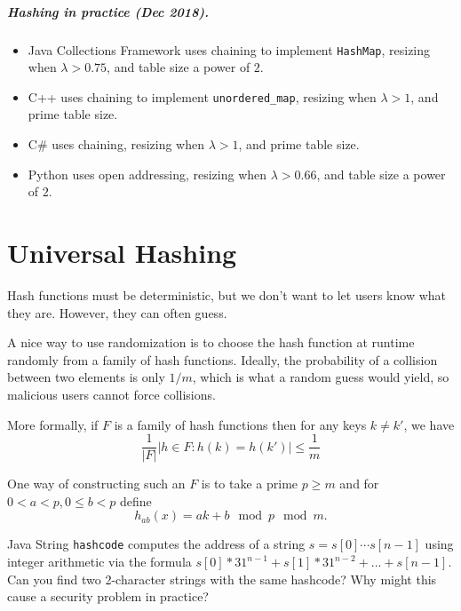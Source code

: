 \paragraph{Hashing in practice (Dec 2018).}
\begin{itemize}
\item Java Collections Framework uses chaining to implement \texttt{HashMap}, resizing when $\lambda > 0.75$, and table size a power of $2$.
\item C++  uses chaining to implement \texttt{unordered\_map}, resizing when $\lambda >1$, and prime table size.
\item C\# uses chaining, resizing when $\lambda >1$, and prime table size.
\item Python uses open addressing, resizing when $\lambda>0.66$, and table size a power of $2$.
\end{itemize}





\chapter{Universal Hashing} %


Hash functions must be deterministic, but we don't want  to let users know what they are. 
However, they can often guess. 

A nice way to use randomization is to choose the hash function at runtime randomly from a family of hash functions.
Ideally,   the probability of a collision between two elements is only $1/m$, which is what a random guess would yield, so malicious users cannot 
force collisions.

More formally, if $F$ is a family of hash functions then for any keys $k\neq k'$, we have
$$
\frac{1}{|F|} \left| h\in F : h(k) = h(k') \right| \leq \frac{1}{m}
$$

\begin{Boxample}[6]
One way of constructing such an $F$ is to take a prime $p\geq m$  and for $0<a <p, 0\leq b < p$ define 
$$h_{ab}(x) = ak+b \mod p \mod m.$$

\end{Boxample}


 

\begin{Boxample}[4]
\item Java String \texttt{hashcode} computes the address of a string 
$s=s[0]\cdots s[n-1]$ using integer arithmetic via the formula 
$s[0]*31^{n-1} + s[1]*31^{n-2} + ... + s[n-1]$. Can you find two 2-character strings with the same hashcode? 
Why might this cause a security problem in practice?
\end{Boxample}

